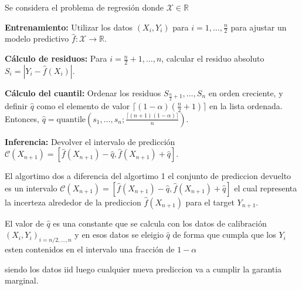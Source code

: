 Se considera el problema de regresión donde $\mathcal{X} \in \mathbb{R}$



\begin{algorithm}[H]
\caption{SCP caso especial - regresión}
\label{alg:conformal_prediction_esp}
    \begin{algorithmic}[1] %
        \STATE \textbf{Entrenamiento:} Utilizar los datos $(X_i, Y_i)$ para $i = 1, \dots, \frac{n}{2}$ para ajustar un modelo predictivo $\hat{f} : \mathcal{X} \to \mathbb{R}$.

        \STATE \textbf{Cálculo de residuos:} Para $i = \frac{n}{2} + 1, \dots, n$, calcular el residuo absoluto $S_i = |Y_i - \hat{f}(X_i)|$.

        \STATE \textbf{Cálculo del cuantil:} Ordenar los residuos $S_{\frac{n}{2}+1}, \dots, S_n$ en orden creciente, y definir $\hat{q}$ como el elemento de valor $\lceil(1 - \alpha)(\frac{n}{2} + 1)\rceil$ en la lista ordenada.
        Entonces, $\hat{q} = \text{quantile}\left(s_1, \dots, s_n; \frac{\lceil(n+1)(1-\alpha)\rceil}{n}\right)$.

        \STATE \textbf{Inferencia:} Devolver el intervalo de predicción $\mathcal{C}(X_{n+1}) = [\hat{f}(X_{n+1}) - \hat{q}, \hat{f}(X_{n+1}) + \hat{q}]$.
    \end{algorithmic}
\end{algorithm}

El algortimo dos a diferencia del algortimo 1 el conjunto de prediccion devuelto es un intervalo $\mathcal{C}(X_{n+1}) = [\hat{f}(X_{n+1}) - \hat{q}, \hat{f}(X_{n+1}) + \hat{q}]$ el cual representa la incerteza alrededor de la prediccion $\hat{f}(X_{n+1})$ para el target $Y_{n+1}$.

El valor de $\hat{q}$ es una constante que se calcula con los datos de calibración $(X_i,Y_i)_{i=n/2, \dots, n}$ y en esos datos se eleigio $\hat{q}$ de forma que cumpla que los $Y_i$ esten contenidos en el intervalo una fracción de $1-\alpha$

siendo los datos iid luego cualquier nueva prediccion va a cumplir la garantia marginal.


